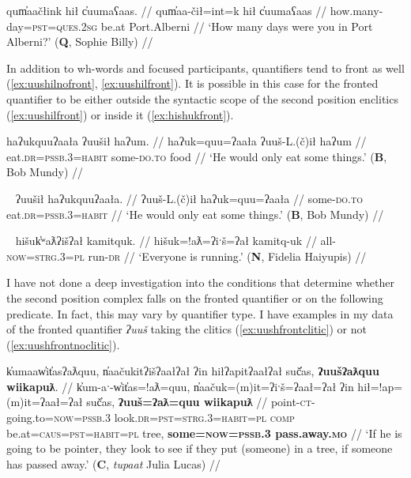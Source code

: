 \ex \label{ex:howmanydays}
\begingl
\glpreamble qum̓aačłink hił c̓uumaʕaas. //
\gla qum̓aa-čił=int=k hił c̓uumaʕaas //
\glb how.many-day=\textsc{pst}=\textsc{ques.2sg} be.at Port.Alberni //
\glft `How many days were you in Port Alberni?' (\textbf{Q}, Sophie Billy) //
\endgl
\xe

In addition to wh-words and focused participants, quantifiers tend to front as well (\ref{ex:uushilnofront}, \ref{ex:uushilfront}). It is possible in this case for the fronted quantifier to be either outside the syntactic scope of the second position enclitics (\ref{ex:uushilfront}) or inside it (\ref{ex:hishukfront}).

\ex \label{ex:uushilnofront}
\begingl
\glpreamble haʔukquuʔaała ʔuušił haʔum. //
\gla haʔuk=quu=ʔaała ʔuuš-L.(č)ił haʔum //
\glb eat.\textsc{dr}=\textsc{pssb.3}=\textsc{habit} some-\textsc{do.to} food //
\glft `He would only eat some things.' (\textbf{B}, Bob Mundy) //
\endgl
\xe

\ex~ \label{ex:uushilfront}
\begingl
\glpreamble ʔuušił haʔukquuʔaała. //
\gla ʔuuš-L.(č)ił haʔuk=quu=ʔaała  //
\glb some-\textsc{do.to} eat.\textsc{dr}=\textsc{pssb.3}=\textsc{habit} //
\glft `He would only eat some things.' (\textbf{B}, Bob Mundy) //
\endgl
\xe

\ex~ \label{ex:hishukfront}
\begingl
\glpreamble hišuk̓ʷaƛʔišʔał kamitquk. //
\gla hišuk=!aƛ=ʔiˑš=ʔał kamitq-uk  //
\glb all-\textsc{now}=\textsc{strg.3}=\textsc{pl} run-\textsc{dr} //
\glft `Everyone is running.' (\textbf{N}, Fidelia Haiyupis) //
\endgl
\xe

I have not done a deep investigation into the conditions that determine whether the second position complex falls on the fronted quantifier or on the following predicate. In fact, this may vary by quantifier type. I have examples in my data of the fronted quantifier \textit{ʔuuš} taking the clitics (\ref{ex:uushfrontclitic}) or not (\ref{ex:uushfrontnoclitic}).

\ex \label{ex:uushfrontclitic}
\begingl
\glpreamble k̓umaaw̓it̓asʔaƛquu, n̓aačukitʔišʔaałʔał ʔin hiłʔapitʔaałʔał suč̓as, \textbf{ʔuušʔaƛquu wiikapuƛ}. //
\gla k̓um-aˑ-w̓it̓as=!aƛ=quu, n̓aačuk=(m)it=ʔiˑš=ʔaał=ʔał ʔin hił=!ap=(m)it=ʔaał=ʔał suč̓as, \textbf{ʔuuš=ʔaƛ=quu wiikapuƛ}  //
\glb point-\textsc{ct}-going.to=\textsc{now}=\textsc{pssb.3} look.\textsc{dr}=\textsc{pst}=\textsc{strg.3}=\textsc{habit}=\textsc{pl} \textsc{comp} be.at=\textsc{caus}=\textsc{pst}=\textsc{habit}=\textsc{pl} tree, \textbf{some=\textsc{now}=\textsc{pssb.3} pass.away.\textsc{mo}} //
\glft `If he is going to be pointer, they look to see if they put (someone) in a tree, if someone has passed away.' (\textbf{C}, \textit{tupaat} Julia Lucas) //
\endgl
\xe

